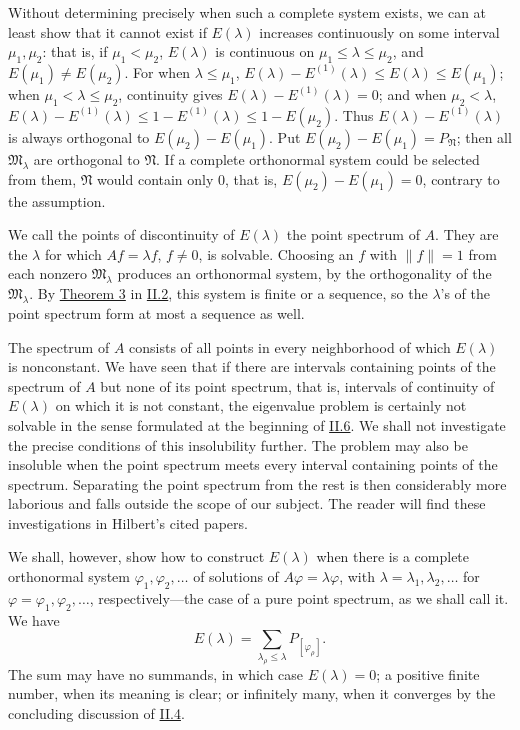 \documentclass[fontsize=13pt,twoside,openany,headings=normal,parskip=false,bookmarkpackage=false,DIV=calc]{scrbook}
\begin{document}
\hypertarget{origpage-65}{}%
Without determining precisely when such a complete system exists, we can at least show that it cannot exist if $E(\lambda)$ increases continuously on some interval $\mu_1,\mu_2$: that is, if $\mu_1<\mu_2$, $E(\lambda)$ is continuous on $\mu_1\leq\lambda\leq\mu_2$, and $E(\mu_1)\ne E(\mu_2)$. For when $\lambda\leq\mu_1$, $E(\lambda)-E^{(1)}(\lambda)\leq E(\lambda)\leq E(\mu_1)$; when $\mu_1<\lambda\leq\mu_2$, continuity gives $E(\lambda)-E^{(1)}(\lambda)=0$; and when $\mu_2<\lambda$, $E(\lambda)-E^{(1)}(\lambda)\leq1-E^{(1)}(\lambda)\leq1-E(\mu_2)$. Thus $E(\lambda)-E^{(1)}(\lambda)$ is always orthogonal to $E(\mu_2)-E(\mu_1)$. Put $E(\mu_2)-E(\mu_1)=P_{\mathfrak{N}}$; then all $\mathfrak{M}_\lambda$ are orthogonal to $\mathfrak{N}$. If a complete orthonormal system could be selected from them, $\mathfrak{N}$ would contain only $0$, that is, $E(\mu_2)-E(\mu_1)=0$, contrary to the assumption.

We call the points of discontinuity of $E(\lambda)$ the point spectrum of $A$. They are the $\lambda$ for which $Af=\lambda f$, $f\ne0$, is solvable. Choosing an $f$ with $\|f\|=1$ from each nonzero $\mathfrak{M}_\lambda$ produces an orthonormal system, by the orthogonality of the $\mathfrak{M}_\lambda$. By \hyperref[thm:II.3infty]{Theorem 3} in \hyperref[sec:II.2]{II.2}, this system is finite or a sequence, so the $\lambda$'s of the point spectrum form at most a sequence as well.

The spectrum of $A$ consists of all points in every neighborhood of which $E(\lambda)$ is nonconstant. We have seen that if there are intervals containing points of the spectrum of $A$ but none of its point spectrum, that is, intervals of continuity of $E(\lambda)$ on which it is not constant, the eigenvalue problem is certainly not solvable in the sense formulated at the beginning of \hyperref[sec:II.6]{II.6}. We shall not investigate the precise conditions of this insolubility further. The problem may also be insoluble when the point spectrum meets every interval containing points of the spectrum. Separating the point spectrum from the rest is then considerably more laborious and falls outside the scope of our subject. The reader will find these investigations in Hilbert's cited papers.

We shall, however, show how to construct $E(\lambda)$ when there is a complete orthonormal system $\varphi_1,\varphi_2,\ldots$ of solutions of $A\varphi=\lambda\varphi$, with $\lambda=\lambda_1,\lambda_2,\ldots$ for $\varphi=\varphi_1,\varphi_2,\ldots$, respectively---the case of a pure point spectrum, as we shall call it. We have
\[
E(\lambda)=\sum_{\lambda_\rho\leq\lambda}P_{[\varphi_\rho]}.
\]
The sum may have no summands, in which case $E(\lambda)=0$; a positive finite number, when its meaning is clear; or infinitely many, when it converges by the concluding discussion of \hyperref[sec:II.4]{II.4}.
\end{document}

